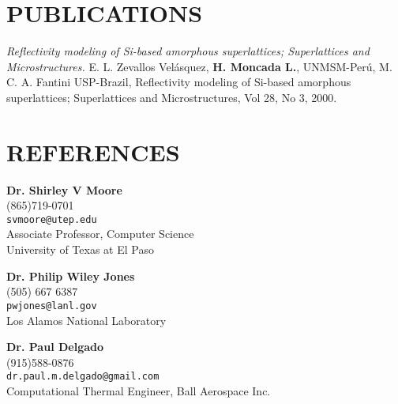 \documentclass[margin]{res}
\begin{document}
\begin{resume}
\section{PUBLICATIONS}
{\sl Reflectivity modeling of Si-based amorphous superlattices; Superlattices and Microstructures.}
E. L. Zevallos Velásquez,\textbf{ H. Moncada L.}, UNMSM-Perú, M. C. A. Fantini USP-Brazil, Reflectivity modeling of Si-based amorphous superlattices;
Superlattices and Microstructures, Vol 28, No 3, 2000.


\section{REFERENCES}

{\bf Dr. Shirley V Moore}\\
(865)719-0701\\
\verb+svmoore@utep.edu+\\
Associate Professor, Computer Science\\
University of Texas at El Paso

{\bf Dr. Philip Wiley Jones} \\
(505) 667 6387\\
\verb+pwjones@lanl.gov+\\
Los Alamos National Laboratory

{\bf Dr. Paul Delgado} \\
(915)588-0876\\
\verb+dr.paul.m.delgado@gmail.com+\\
Computational Thermal Engineer,
Ball Aerospace Inc.


% 

\end{resume}
\end{document}

